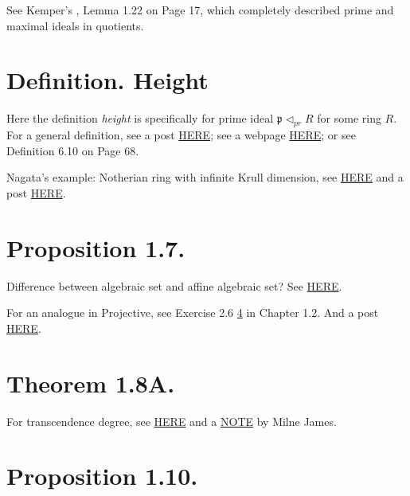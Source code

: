 See Kemper's \cite{kemper2011course}, Lemma 1.22 on Page 17, which completely described prime and maximal ideals in quotients.

\section{Definition. Height}

Here the definition \textit{height} is specifically for prime ideal $\mathfrak p \vartriangleleft_{pr} R$ for some ring $R$. For a general definition, see a post \href{https://math.stackexchange.com/questions/2689141/definition-of-height-of-an-ideal}{HERE}; see a webpage \href{https://encyclopediaofmath.org/wiki/Height_of_an_ideal}{HERE}; or see \cite{kemper2011course} Definition 6.10 on Page 68.

Nagata's example: Notherian ring with infinite Krull dimension, see \href{https://math.stackexchange.com/questions/1109732/noetherian-ring-with-infinite-krull-dimension-nagatas-example}{HERE} and a post \href{https://mathoverflow.net/questions/21067/noetherian-rings-of-infinite-krull-dimension?_gl=1*1kwuhw1*_ga*MzA3ODU1MDgwLjE2OTY5Nzg1OTg.*_ga_S812YQPLT2*MTY5Njk3ODU5Ny4xLjEuMTY5Njk4MDUwNS4wLjAuMA..}{HERE}.

\section{Proposition 1.7.}

Difference between algebraic set and affine algebraic set? See \href{https://math.stackexchange.com/questions/3486407/difference-between-algebraic-set-and-affine-algebraic-set-in-hartshorne}{HERE}.

For an analogue in Projective, see Exercise 2.6 \ref{} in Chapter 1.2. And a post \href{https://math.stackexchange.com/questions/670156/hartshorne-exercise-2-6}{HERE}.

\section{Theorem 1.8A.}

For transcendence degree, see \href{https://en.wikipedia.org/wiki/Transcendental_extension#CITEREFMilne}{HERE} and a \href{https://www.jmilne.org/math/CourseNotes/FT.pdf}{NOTE} by Milne James.

\section{Proposition 1.10.}

